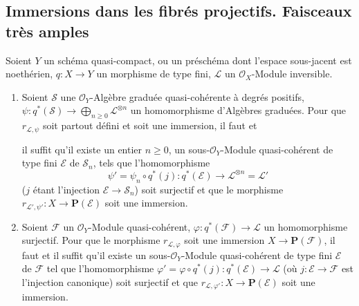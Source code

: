 \subsection{Immersions dans les fibrés projectifs. Faisceaux très amples}
\label{subsection:II.4.4-fr}

\begin{proposition}[4.4.1]
\label{II.4.4.1-fr}
Soient $Y$ un schéma quasi-compact, ou un préschéma dont l'espace sous-jacent
est noethérien, $q:X\to Y$ un morphisme de type fini, $\mathcal{L}$ un
$\mathcal{O}_X$-Module inversible.
\begin{enumerate}
  \item[\rm{(i)}] Soient $\mathcal{S}$ une $\mathcal{O}_Y$-Algèbre graduée
  quasi-cohérente à degrés positifs,
  $\psi:q^*(\mathcal{S})\to\bigoplus_{n\geq0}\mathcal{L}^{\otimes n}$ un
  homomorphisme d'Algèbres graduées. Pour que $r_{\mathcal{L},\psi}$ soit
  partout défini et soit une immersion, il faut et


  il suffit qu'il existe un entier $n\geq0$, un sous-$\mathcal{O}_Y$-Module
  quasi-cohérent de type fini $\mathcal{E}$ de $\mathcal{S}_n$, tels que
  l'homomorphisme
  \[
    \psi'=\psi_n\circ q^*(j):q^*(\mathcal{E})
      \longrightarrow\mathcal{L}^{\otimes n}=\mathcal{L}'
  \]
  ($j$ étant l'injection $\mathcal{E}\to\mathcal{S}_n$) soit surjectif et que
  le morphisme
  $r_{\mathcal{L}',\psi'}:X\to\mathbf{P}(\mathcal{E})$ soit une immersion.
  \item[\rm{(ii)}] Soient $\mathcal{F}$ un $\mathcal{O}_Y$-Module
  quasi-cohérent, $\varphi:q^*(\mathcal{F})\to\mathcal{L}$ un homomorphisme
  surjectif. Pour que le morphisme $r_{\mathcal{L},\varphi}$ soit une
  immersion $X\to\mathbf{P}(\mathcal{F})$, il faut et il suffit qu'il existe
  un sous-$\mathcal{O}_Y$-Module quasi-cohérent de type fini $\mathcal{E}$ de
  $\mathcal{F}$ tel que l'homomorphisme
  $\varphi'=\varphi\circ q^*(j):q^*(\mathcal{E})\to\mathcal{L}$ (où
  $j:\mathcal{E}\to\mathcal{F}$ est l'injection canonique) soit surjectif et
  que $r_{\mathcal{L},\varphi'}:X\to\mathbf{P}(\mathcal{E})$ soit une
  immersion.
\end{enumerate}
\end{proposition}

